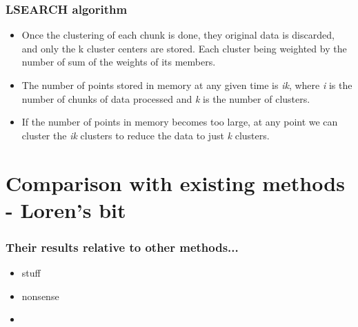 \documentclass{beamer}
\begin{document}
\frame
{
  \frametitle{LSEARCH algorithm}

   \begin{itemize}
  \item Once the clustering of each chunk is done, they original data
    is discarded, and only the k cluster centers are stored. Each
    cluster being weighted by the number of sum of the weights of its
    members.

  \item The number of points stored in memory at any given time is
    {\em ik}, where {\em i} is the number of chunks of data processed
    and {\em k} is the number of clusters.

  \item If the number of points in memory becomes too large, at any
    point we can cluster the {\em ik} clusters to reduce the data to
    just {\em k} clusters.
  \end{itemize}

}

\section{Comparison with existing methods - Loren's bit}
\frame
{
  \frametitle{Their results relative to other methods...}

  \begin{itemize}
  \item stuff
  \item nonsense
  \item      
  \end{itemize}
}


  
\end{document}
